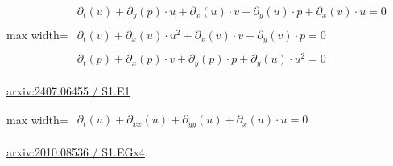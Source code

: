 \documentclass[UTF8,10pt,a4paper,fontset=mac]{ctexart}
\begin{document}
\begin{minipage}{\linewidth}\begin{center}\begin{adjustbox}{max width=\linewidth}$\displaystyle\begin{gathered}\begin{gathered}\partial_{t}(u)+\partial_{y}(p)\cdot u+\partial_{x}(u)\cdot v+\partial_{y}(u)\cdot p+\partial_{x}(v)\cdot u=0\end{gathered}\\[5pt]\begin{gathered}\partial_{t}(v)+\partial_{x}(u)\cdot u^{2}+\partial_{x}(v)\cdot v+\partial_{y}(v)\cdot p=0\end{gathered}\\[5pt]\begin{gathered}\partial_{t}(p)+\partial_{x}(p)\cdot v+\partial_{y}(p)\cdot p+\partial_{y}(u)\cdot u^{2}=0\end{gathered}\end{gathered}$\end{adjustbox}\end{center}{\small\href{https://arxiv.org/html/2407.06455#S1.E1}{arxiv:2407.06455 / S1.E1}}\par\end{minipage}\par\vspace{6mm}

\begin{minipage}{\linewidth}\begin{center}\begin{adjustbox}{max width=\linewidth}$\displaystyle\begin{gathered}\begin{gathered}\partial_{t}(u)+\partial_{xx}(u)+\partial_{yy}(u)+\partial_{x}(u)\cdot u=0\end{gathered}\end{gathered}$\end{adjustbox}\end{center}{\small\href{https://arxiv.org/html/2010.08536#S1.EGx4}{arxiv:2010.08536 / S1.EGx4}}\par\end{minipage}\par\vspace{6mm}
\end{document}
